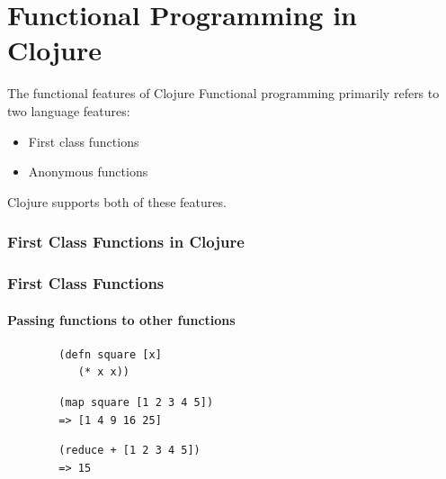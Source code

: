 \documentclass[xcolor=dvipsnames]{beamer}
\begin{document}
		
		
%
%					
%
	\section{Functional Programming in Clojure}
		\begin{frame}{The functional features of Clojure}
			Functional programming primarily refers to two language features:
			\begin{itemize}
			\item First class functions
			\item Anonymous functions
			\end{itemize}		
			Clojure supports both of these features.
		\end{frame}
		\subsubsection{First Class Functions in Clojure}
		\begin{frame}[fragile]
		\frametitle{First Class Functions}
		\framesubtitle{Passing functions to other functions}
		
		\begin{verbatim}
		(defn square [x] 
		   (* x x))
		\end{verbatim}
		\pause
		\begin{verbatim}
		(map square [1 2 3 4 5])
		=> [1 4 9 16 25]
		\end{verbatim}
		\pause
		\begin{verbatim}
		(reduce + [1 2 3 4 5])
		=> 15
		\end{verbatim}
		\end{frame}
\end{document}
